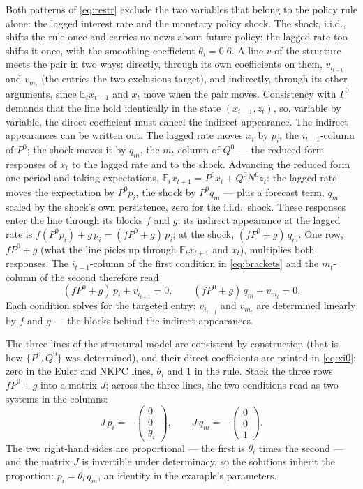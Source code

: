 \documentclass[11pt]{article}
\theoremstyle{remark}
\newcommand{\E}{\mathbb{E}}
\begin{document}
Both patterns of \eqref{eq:restr} exclude the two variables that belong to the policy rule alone: the lagged interest rate and the monetary policy shock. The shock, i.i.d., shifts the rule once and carries no news about future policy; the lagged rate too shifts it once, with the smoothing coefficient $\theta_i=0.6$. A line $v$ of the structure meets the pair in two ways: directly, through its own coefficients on them, $v_{i_{t-1}}$ and $v_{m_t}$ (the entries the two exclusions target), and indirectly, through its other arguments, since $\E_tx_{t+1}$ and $x_t$ move when the pair moves. Consistency with $\Gamma^0$ demands that the line hold identically in the state $(x_{t-1},z_t)$, so, variable by variable, the direct coefficient must cancel the indirect appearance. The indirect appearances can be written out. The lagged rate moves $x_t$ by $p_i$, the $i_{t-1}$-column of $P^0$; the shock moves it by $q_m$, the $m_t$-column of $Q^0$ --- the reduced-form responses of $x_t$ to the lagged rate and to the shock. Advancing the reduced form one period and taking expectations, $\E_tx_{t+1}=P^0x_t+Q^0N^0z_t$: the lagged rate moves the expectation by $P^0p_i$, the shock by $P^0q_m$ --- plus a forecast term, $q_m$ scaled by the shock's own persistence, zero for the i.i.d.\ shock. These responses enter the line through its blocks $f$ and $g$: its indirect appearance at the lagged rate is $f(P^0p_i)+g\,p_i=(fP^0+g)\,p_i$; at the shock, $(fP^0+g)\,q_m$. One row, $fP^0+g$ (what the line picks up through $\E_tx_{t+1}$ and $x_t$), multiplies both responses. The $i_{t-1}$-column of the first condition in \eqref{eq:brackets} and the $m_t$-column of the second therefore read
\begin{equation*}
(fP^0+g)\,p_i+v_{i_{t-1}}=0, \qquad (fP^0+g)\,q_m+v_{m_t}=0.
\end{equation*}
Each condition solves for the targeted entry: $v_{i_{t-1}}$ and $v_{m_t}$ are determined linearly by $f$ and $g$ --- the blocks behind the indirect appearances.

The three lines of the structural model are consistent by construction (that is how $\{P^0,Q^0\}$ was determined), and their direct coefficients are printed in \eqref{eq:xi0}: zero in the Euler and NKPC lines, $\theta_i$ and $1$ in the rule. Stack the three rows $fP^0+g$ into a matrix $J$; across the three lines, the two conditions read as two systems in the columns:
\begin{equation*}
J\,p_i=-\begin{pmatrix}0\\0\\\theta_i\end{pmatrix}, \qquad J\,q_m=-\begin{pmatrix}0\\0\\1\end{pmatrix}.
\end{equation*}
The two right-hand sides are proportional --- the first is $\theta_i$ times the second --- and the matrix $J$ is invertible under determinacy, so the solutions inherit the proportion: $p_i=\theta_i\,q_m$, an identity in the example's parameters.
\end{document}
